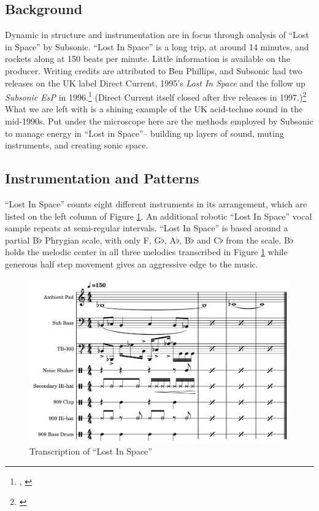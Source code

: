 \documentclass[12pt,twoside]{reedthesis}
\begin{document}
\subsection{Background}

Dynamic in structure and instrumentation are in focus through analysis of ``Lost in Space'' by Subsonic. ``Lost In Space'' is a long trip, at around 14 minutes, and rockets along at 150 beats per minute. Little information is available on the producer. Writing credits are attributed to Ben Phillips, and Subsonic had two releases on the UK label Direct Current, 1995's \emph{Lost In Space} and the follow up \emph{Subsonic EsP} in 1996.\footnote{\cite{SubsonicSubsonicEsP}, \cite{subsonicLostInSpace1995}} (Direct Current itself closed after five releases in 1997.)\footnote{\cite{DirectCurrent}} What we are left with is a shining example of the UK acid-techno sound in the mid-1990s. Put under the microscope here are the methods employed by Subsonic to manage energy in ``Lost in Space''-- building up layers of sound, muting instruments, and creating sonic space.

\subsection{Instrumentation and Patterns}

``Lost In Space'' counts eight different instruments in its arrangement, which are listed on the left column of Figure \ref{fig:lostinspace}. An additional robotic ``Lost In Space'' vocal sample repeats at semi-regular intervals. ``Lost In Space'' is based around a partial B$\flat$ Phrygian scale, with only F, G$\flat$, A$\flat$, B$\flat$ and C$\flat$ from the scale. B$\flat$ holds the melodic center in all three melodies transcribed in Figure \ref{fig:lostinspace} while generous half step movement gives an aggressive edge to the music.

\begin{figure}
	\begin{centering}
		\includegraphics[width=6in]{./Images/Lost_in_Space_3}
		\caption{Transcription of ``Lost In Space''}
		\label{fig:lostinspace}
	\end{centering}
\end{figure}
\end{document}
